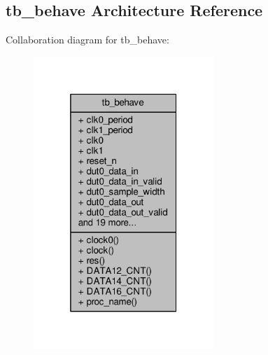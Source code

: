 \subsection{tb\+\_\+behave Architecture Reference}
\label{classbit__unpack__tb_1_1tb__behave}


Collaboration diagram for tb\+\_\+behave\+:\nopagebreak
\begin{figure}[H]
\begin{center}
\leavevmode
\includegraphics[width=193pt]{d2/de9/classbit__unpack__tb_1_1tb__behave__coll__graph}
\end{center}
\end{figure}
